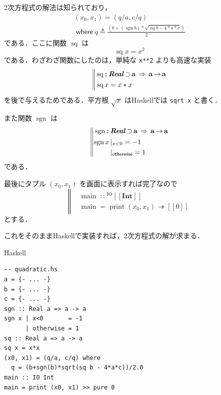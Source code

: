 \documentclass[a5paper,twoside,fleqn,draft]{jsbook}
\def\[{[\![}
\def\]{]\!]}
\DeclareMathOperator{\sgn}{sgn}
\newcommand{\programminglanguage}[1]{\textsf{#1}}
\newcommand{\haskell}{\programminglanguage{Haskell}}
\newcommand{\code}[1]{\texttt{#1}}
\newenvironment{haskellcode}{\begin{itembox}[r]{\haskell}}{\end{itembox}}
\newcommand{\mBrace}{\Vert}
\newcommand{\mKeyword}[1]{\mathsf{#1}}
\newcommand{\mOtherwiseKeyword}{\mKeyword{otherwise}}
\newcommand{\mWhereKeyword}{\mKeyword{where}}
\DeclareMathOperator{\mOtherwise}{\mOtherwiseKeyword}
\DeclareMathOperator{\mSuperClass}{\;\Rightarrow\;}
\DeclareMathOperator{\mSuperSet}{\supset}
\DeclareMathOperator{\mWhere}{\mWhereKeyword}
\newcommand{\mSpecialFunc}[1]{\mathrm{#1}}
\DeclareMathOperator{\mSq}{\mSpecialFunc{sq}}
\newcommand{\mAction}[1]{\mathrm{#1}}
\DeclareMathOperator{\mMain}{\mAction{main}}
\DeclareMathOperator{\mPrint}{\mAction{print}}
\DeclareMathOperator{\mBindRightIgnore}{\twoheadrightarrow}
\DeclareMathOperator{\mFuncArrow}{\rightarrow}
\DeclareMathOperator{\mIn}{{:\!:}}
\DeclareMathOperator{\mLetEq}{\triangleq}
\newcommand{\mType}[1]{\mathbf{#1}} %
\newcommand{\mA}{\mType{a}}
\newcommand{\mIntType}{\mType{Int}}
\newcommand{\mTypeAssemble}[2]{{}^\mathrm{#1}\[\mType{#2}\]}
\newcommand{\mIOType}[1]{\mTypeAssemble{IO}{#1}}
\newcommand{\mIOIntType}{\mIOType{\mIntType}}
\newcommand{\mPureWith}[1]{\[#1\]}
\newcommand{\mTypeClass}[1]{\textbf{\textit{#1}}}
\newcommand{\mRealTypeClass}{\mTypeClass{Real}}
\newcommand{\mGuard}[1]{\mathop{\mid_{#1}}}
\newcommand{\mProjEXP}[2]{#1\mFuncArrow#2} %
\begin{document}
2次方程式の解法は知られており，
\begin{multline}
  (x_0,x_1)=(q/a,c/q)\\
  \mWhere q\mLetEq\frac{\left(b+(\sgn b)*\sqrt{\mSq b-4*a*c}\right)}{2}
\end{multline}
である．ここに関数 $\mSq$ は
\begin{equation}
  \mSq x=x^2
\end{equation}
である．わざわざ関数にしたのは，単純な \code{x**2} よりも高速な実装
\begin{equation}
  \left\mBrace
  \begin{aligned}
    &\mSq\mIn\mRealTypeClass\mSuperSet\mA
    \mSuperClass\mProjEXP{\mA}{\mA}\\
    &\mSq x=x*x
  \end{aligned}
  \right.
\end{equation}
を後で与えるためである．平方根 $\sqrt{x}$ は\haskell では \code{sqrt
  x} と書く．

また関数 $\sgn$ は
\begin{equation}
  \left\mBrace
  \begin{aligned}
    {}&\sgn\mIn{}\mRealTypeClass\mSuperSet\mA
    \mSuperClass\mProjEXP{\mA }{\mA }\\
    {}&
    \begin{aligned}
      \sgn x&\mGuard{x<0}=-1\\
      &\mGuard{\mOtherwise}=1
    \end{aligned}
  \end{aligned}
  \right.
\end{equation}
である．

最後にタプル $(x_0,x_1)$ を画面に表示すれば完了なので
\begin{equation}
  \left\mBrace
  \begin{aligned}
    {}&\mMain\mIn\mIOIntType\\
    {}&\mMain=\mPrint(x_0,x_1)\mBindRightIgnore\mPureWith{0}
  \end{aligned}
  \right.
\end{equation}
とする．

これをそのまま\haskell で実装すれば，2次方程式の解が求まる．
\begin{haskellcode}
\begin{verbatim}
-- quadratic.hs
a = {- ... -}
b = {- ... -}
c = {- ... -}
sgn :: Real a => a -> a
sgn x | x<0       = -1
      | otherwise = 1
sq :: Real a => a -> a
sq x = x*x
(x0, x1) = (q/a, c/q) where
  q = (b+sgn(b)*sqrt(sq b - 4*a*c))/2.0
main :: IO Int
main = print (x0, x1) >> pure 0
\end{verbatim}
\end{haskellcode}
\end{document}
